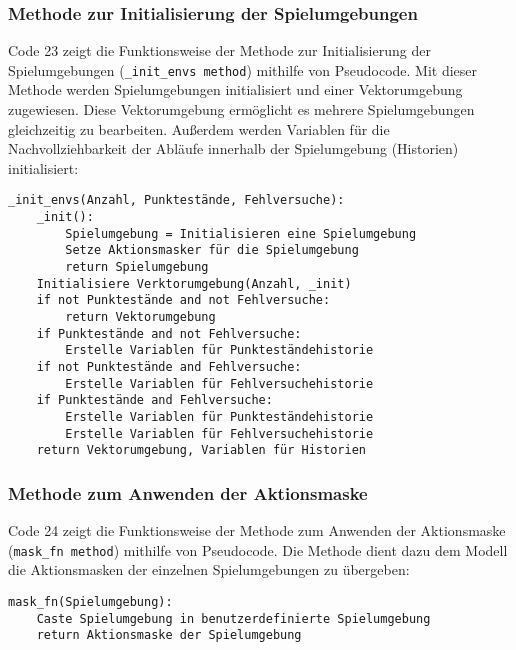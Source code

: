 \subsubsection{Methode zur Initialisierung der Spielumgebungen}
\begin{minipage}{\linewidth}
Code 23 zeigt die Funktionsweise der Methode zur Initialisierung der Spielumgebungen (\texttt{\_init\_envs method}) mithilfe von Pseudocode. Mit dieser Methode werden Spielumgebungen initialisiert und einer Vektorumgebung zugewiesen. Diese Vektorumgebung ermöglicht es mehrere Spielumgebungen gleichzeitig zu bearbeiten. Außerdem werden Variablen für die Nachvollziehbarkeit der Abläufe innerhalb der Spielumgebung (Historien) initialisiert:
\vspace{0.5cm}
\begin{lstlisting}[caption={Methode zur Initialisierung der Spielumgebungen}]
_init_envs(Anzahl, Punktestände, Fehlversuche):
	_init():
		Spielumgebung = Initialisieren eine Spielumgebung
		Setze Aktionsmasker für die Spielumgebung
		return Spielumgebung
	Initialisiere Verktorumgebung(Anzahl, _init)
	if not Punktestände and not Fehlversuche:
		return Vektorumgebung
	if Punktestände and not Fehlversuche:
		Erstelle Variablen für Punkteständehistorie
	if not Punktestände and Fehlversuche:
		Erstelle Variablen für Fehlversuchehistorie
	if Punktestände and Fehlversuche:
		Erstelle Variablen für Punkteständehistorie
		Erstelle Variablen für Fehlversuchehistorie
	return Vektorumgebung, Variablen für Historien
\end{lstlisting}
\end{minipage}

\subsubsection{Methode zum Anwenden der Aktionsmaske}
\begin{minipage}{\linewidth}
Code 24 zeigt die Funktionsweise der Methode zum Anwenden der Aktionsmaske (\texttt{mask\_fn method}) mithilfe von Pseudocode. Die Methode dient dazu dem Modell die Aktionsmasken der einzelnen Spielumgebungen zu übergeben:
\vspace{0.5cm}
\begin{lstlisting}[caption={Methode zum Anwenden der Aktionsmaske}]
mask_fn(Spielumgebung):
	Caste Spielumgebung in benutzerdefinierte Spielumgebung
	return Aktionsmaske der Spielumgebung
\end{lstlisting}
\end{minipage}

